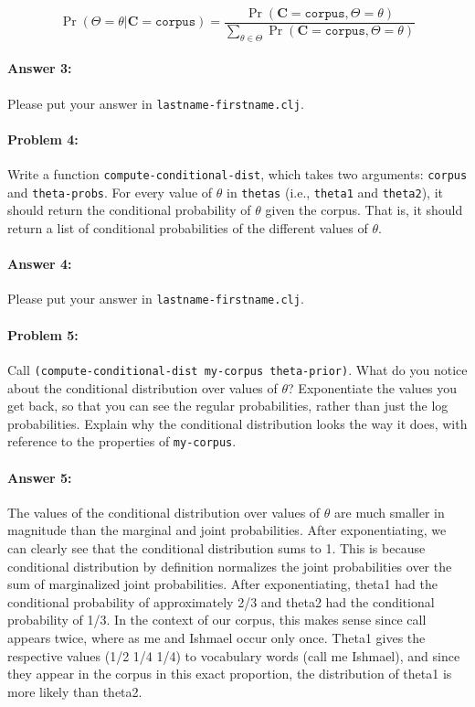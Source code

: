 \documentclass[10pt]{article}
\begin{document}
\begin{equation}
  \Pr(\Theta=\theta|\mathbf{C}=\texttt{corpus}) = \frac{\Pr(\mathbf{C}=\texttt{corpus},\Theta=\theta)}{\sum_{\theta \in \Theta} \Pr(\mathbf{C}=\texttt{corpus}, \Theta=\theta)}
\end{equation}

\paragraph{Answer 3:} Please put your answer in \texttt{lastname-firstname.clj}.

\hrulefill
\paragraph{Problem 4:}

Write a function \texttt{compute-conditional-dist}, which takes two
arguments: \texttt{corpus} and \texttt{theta-probs}. For every value
of $\theta$ in \texttt{thetas} (i.e., \texttt{theta1} and
\texttt{theta2}), it should return the conditional probability of
$\theta$ given the corpus. That is, it should return a list of
conditional probabilities of the different values of $\theta$.

\paragraph{Answer 4:} Please put your answer in
\texttt{lastname-firstname.clj}.

\hrulefill
\paragraph{Problem 5:}
 
Call \texttt{(compute-conditional-dist my-corpus theta-prior)}. What
do you notice about the conditional distribution over values of
$\theta$?  Exponentiate the values you get back, so that you can see
the regular probabilities, rather than just the log
probabilities. Explain why the conditional distribution looks the way
it does, with reference to the properties of \texttt{my-corpus}.

\paragraph{Answer 5:} The values of the conditional distribution over values of $\theta$ are much smaller in magnitude than the marginal and joint probabilities. After exponentiating, we can clearly see that the conditional distribution sums to 	1. This is because conditional distribution by definition normalizes the joint probabilities over the sum of marginalized joint probabilities. After exponentiating, theta1 had the conditional probability of approximately 2/3 and theta2 had the conditional probability of 1/3. In the context of our corpus, this makes sense since call appears twice, where as me and Ishmael occur only once. Theta1 gives the respective values (1/2 1/4 1/4) to vocabulary words (call me Ishmael), and since they appear in the corpus in this exact proportion, the distribution of theta1 is more likely than theta2. 
\end{document}
